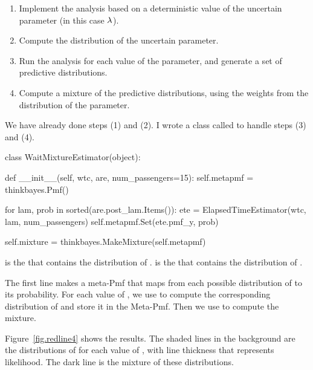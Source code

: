\documentclass[12pt]{book}
\theoremstyle{exercise}
\begin{document}
\begin{enumerate}

\item Implement the analysis based on a deterministic value of the
  uncertain parameter (in this case $\mathtt{\lambda}$).

\item Compute the distribution of the uncertain parameter.

\item Run the analysis for each value of the parameter, and generate a
  set of predictive distributions.

\item Compute a mixture of the predictive distributions, using the
  weights from the distribution of the parameter.

\end{enumerate}

We have already done steps (1) and (2).  I wrote a class
called  to handle steps (3) and (4).

\begin{code}
class WaitMixtureEstimator(object):

    def __init__(self, wtc, are, num_passengers=15):
        self.metapmf = thinkbayes.Pmf()

        for lam, prob in sorted(are.post_lam.Items()):
            ete = ElapsedTimeEstimator(wtc, lam, num_passengers)
            self.metapmf.Set(ete.pmf_y, prob)

        self.mixture = thinkbayes.MakeMixture(self.metapmf)
\end{code}

 is the  that contains the
distribution of .   is the 
that contains the distribution of .

The first line makes a meta-Pmf that maps from each possible
distribution of  to its probability.  For each value
of , we use  to
compute the corresponding distribution of
 and store it in the Meta-Pmf.  Then
we use  to compute the mixture.


Figure~\ref{fig.redline4} shows the results.  The shaded lines
in the background are the distributions of  for each value
of , with line thickness that represents likelihood.
The dark line is the mixture of these distributions.
\end{document}
